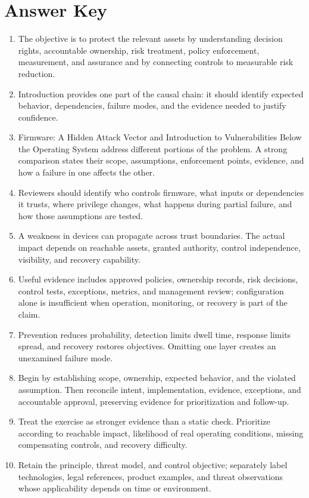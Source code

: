 \documentclass[11pt,letterpaper]{article}
\begin{document}
\section*{Answer Key}
\begin{enumerate}
\item The objective is to protect the relevant assets by understanding decision rights, accountable ownership, risk treatment, policy enforcement, measurement, and assurance and by connecting controls to measurable risk reduction.
\item Introduction provides one part of the causal chain: it should identify expected behavior, dependencies, failure modes, and the evidence needed to justify confidence.
\item Firmware: A Hidden Attack Vector and Introduction to Vulnerabilities Below the Operating System address different portions of the problem. A strong comparison states their scope, assumptions, enforcement points, evidence, and how a failure in one affects the other.
\item Reviewers should identify who controls firmware, what inputs or dependencies it trusts, where privilege changes, what happens during partial failure, and how those assumptions are tested.
\item A weakness in devices can propagate across trust boundaries. The actual impact depends on reachable assets, granted authority, control independence, visibility, and recovery capability.
\item Useful evidence includes approved policies, ownership records, risk decisions, control tests, exceptions, metrics, and management review; configuration alone is insufficient when operation, monitoring, or recovery is part of the claim.
\item Prevention reduces probability, detection limits dwell time, response limits spread, and recovery restores objectives. Omitting one layer creates an unexamined failure mode.
\item Begin by establishing scope, ownership, expected behavior, and the violated assumption. Then reconcile intent, implementation, evidence, exceptions, and accountable approval, preserving evidence for prioritization and follow-up.
\item Treat the exercise as stronger evidence than a static check. Prioritize according to reachable impact, likelihood of real operating conditions, missing compensating controls, and recovery difficulty.
\item Retain the principle, threat model, and control objective; separately label technologies, legal references, product examples, and threat observations whose applicability depends on time or environment.
\end{enumerate}
\end{document}
